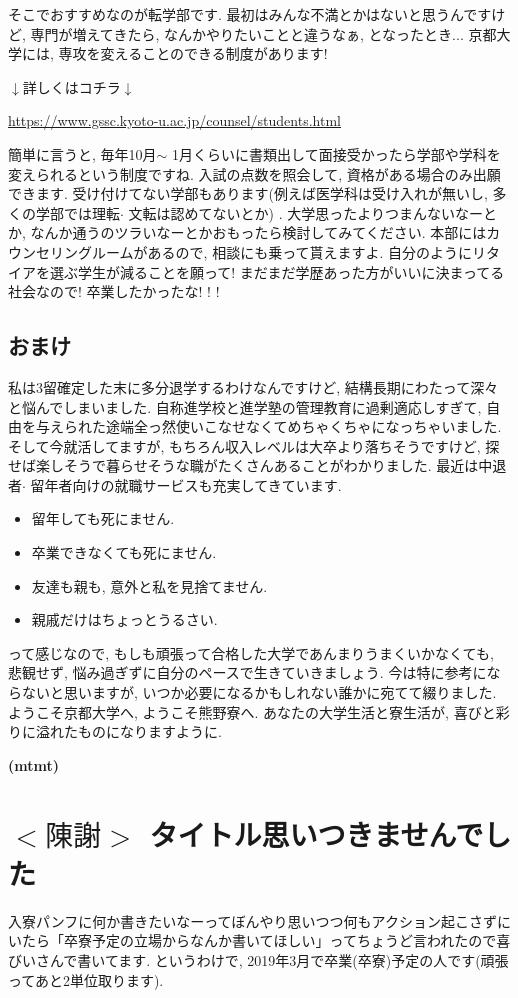 \documentclass[10pt,b5jsbook,dvips,dvipdfmx,openany]{jsbook}
\theoremstyle{definition}
\begin{document}
		そこでおすすめなのが転学部です. 最初はみんな不満とかはないと思うんですけど, 専門が増えてきたら, なんかやりたいことと違うなぁ, となったとき... 京都大学には, 専攻を変えることのできる制度があります!

		$\downarrow$詳しくはコチラ$\downarrow$

		\url{https://www.gssc.kyoto-u.ac.jp/counsel/students.html}

		簡単に言うと, 毎年10月$ \sim $ 1月くらいに書類出して面接受かったら学部や学科を変えられるという制度ですね. 入試の点数を照会して, 資格がある場合のみ出願できます. 受け付けてない学部もあります(例えば医学科は受け入れが無いし, 多くの学部では理転$ \cdot $ 文転は認めてないとか) . 大学思ったよりつまんないなーとか, なんか通うのツラいなーとかおもったら検討してみてください. 本部にはカウンセリングルームがあるので, 相談にも乗って貰えますよ. 自分のようにリタイアを選ぶ学生が減ることを願って! まだまだ学歴あった方がいいに決まってる社会なので! 卒業したかったな! ! !

		\subsection{おまけ}
		私は3留確定した末に多分退学するわけなんですけど, 結構長期にわたって深々と悩んでしまいました. 自称進学校と進学塾の管理教育に過剰適応しすぎて, 自由を与えられた途端全っ然使いこなせなくてめちゃくちゃになっちゃいました. そして今就活してますが, もちろん収入レベルは大卒より落ちそうですけど, 探せば楽しそうで暮らせそうな職がたくさんあることがわかりました. 最近は中退者$ \cdot $ 留年者向けの就職サービスも充実してきています.
		\begin{itemize}
		\item 留年しても死にません.
		\item 卒業できなくても死にません.
		\item 友達も親も, 意外と私を見捨てません.
		\item 親戚だけはちょっとうるさい.
		\end{itemize}
		って感じなので, もしも頑張って合格した大学であんまりうまくいかなくても, 悲観せず, 悩み過ぎずに自分のペースで生きていきましょう. 今は特に参考にならないと思いますが, いつか必要になるかもしれない誰かに宛てて綴りました.
        ようこそ京都大学へ, ようこそ熊野寮へ. あなたの大学生活と寮生活が, 喜びと彩りに溢れたものになりますように.

{\bf (mtmt)}

	\section{$<陳謝>$ タイトル思いつきませんでした} %
	入寮パンフに何か書きたいなーってぼんやり思いつつ何もアクション起こさずにいたら「卒寮予定の立場からなんか書いてほしい」ってちょうど言われたので喜びいさんで書いてます. というわけで, 2019年3月で卒業(卒寮)予定の人です(頑張ってあと2単位取ります).
\end{document}
